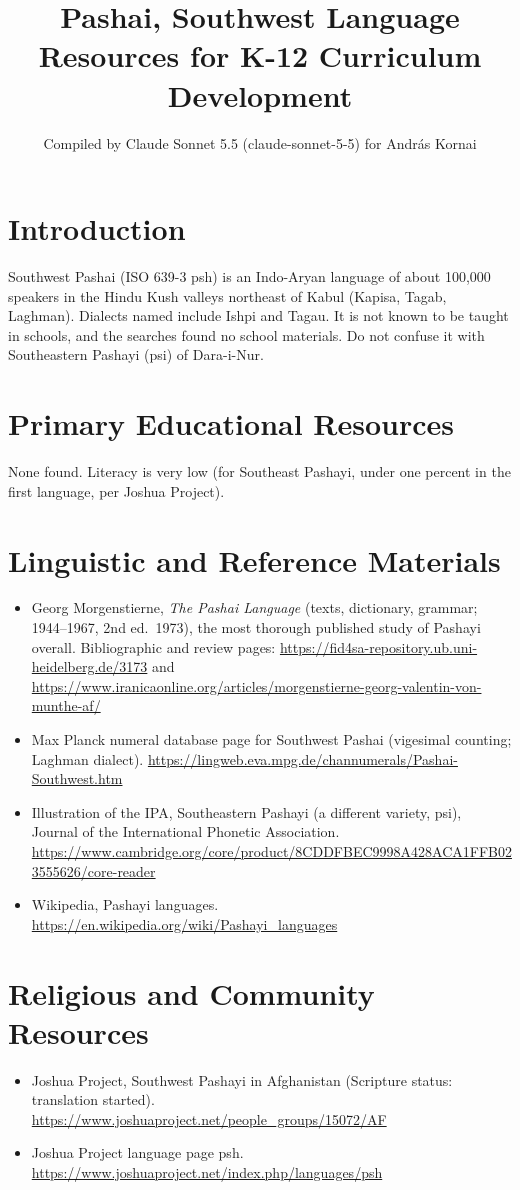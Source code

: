 \documentclass[12pt]{article}
\title{Pashai, Southwest Language Resources for K-12 Curriculum Development}
\author{Compiled by Claude Sonnet 5.5 (claude-sonnet-5-5) for Andr\'as Kornai}
\date{}
\begin{document}
\maketitle

\section{Introduction}
Southwest Pashai (ISO 639-3 psh) is an Indo-Aryan language of about 100,000 speakers in the Hindu Kush valleys northeast of Kabul (Kapisa, Tagab, Laghman). Dialects named include Ishpi and Tagau. It is not known to be taught in schools, and the searches found no school materials. Do not confuse it with Southeastern Pashayi (psi) of Dara-i-Nur.

\section{Primary Educational Resources}
None found. Literacy is very low (for Southeast Pashayi, under one percent in the first language, per Joshua Project).

\section{Linguistic and Reference Materials}
\begin{itemize}
\item Georg Morgenstierne, \emph{The Pashai Language} (texts, dictionary, grammar; 1944--1967, 2nd ed.\ 1973), the most thorough published study of Pashayi overall. Bibliographic and review pages: \url{https://fid4sa-repository.ub.uni-heidelberg.de/3173} and \url{https://www.iranicaonline.org/articles/morgenstierne-georg-valentin-von-munthe-af/}
\item Max Planck numeral database page for Southwest Pashai (vigesimal counting; Laghman dialect). \url{https://lingweb.eva.mpg.de/channumerals/Pashai-Southwest.htm}
\item Illustration of the IPA, Southeastern Pashayi (a different variety, psi), Journal of the International Phonetic Association. \url{https://www.cambridge.org/core/product/8CDDFBEC9998A428ACA1FFB023555626/core-reader}
\item Wikipedia, Pashayi languages. \url{https://en.wikipedia.org/wiki/Pashayi_languages}
\end{itemize}

\section{Religious and Community Resources}
\begin{itemize}
\item Joshua Project, Southwest Pashayi in Afghanistan (Scripture status: translation started). \url{https://www.joshuaproject.net/people_groups/15072/AF}
\item Joshua Project language page psh. \url{https://www.joshuaproject.net/index.php/languages/psh}
\end{itemize}
\end{document}
